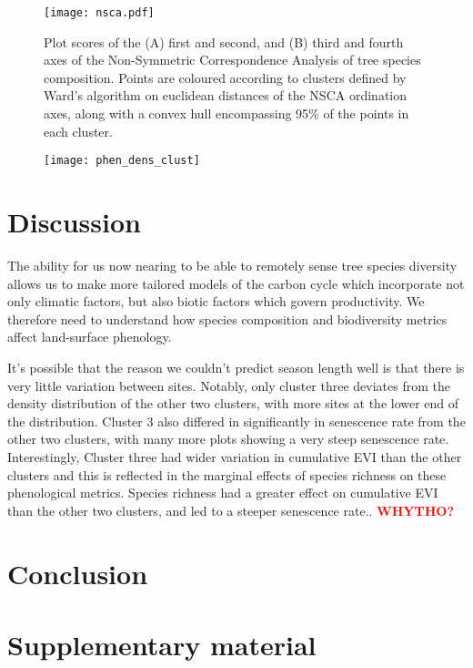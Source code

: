 \documentclass[11pt,a4paper]{article}
\newcommand{\todo}[1]{\textcolor{red}{\textbf{#1}}}   %
\begin{document}
\begin{figure}[H]
\centering
	\texttt{[image: nsca.pdf]}
	\caption{Plot scores of the (A) first and second, and (B) third and fourth axes of the Non-Symmetric Correspondence Analysis of tree species composition. Points are coloured according to clusters defined by Ward's algorithm on euclidean distances of the NSCA ordination axes, along with a convex hull encompassing 95\% of the points in each cluster.}
	\label{nsca}
\end{figure}

\begin{figure}[H]
\centering
	\texttt{[image: phen\_dens\_clust]}
	\caption{}
	\label{phen_dens_clust}
\end{figure}

\section{Discussion}

The ability for us now nearing to be able to remotely sense tree species diversity allows us to make more tailored models of the carbon cycle which incorporate not only climatic factors, but also biotic factors which govern productivity. We therefore need to understand how species composition and biodiversity metrics affect land-surface phenology. 

It's possible that the reason we couldn't predict season length well is that there is very little variation between sites. Notably, only cluster three deviates from the density distribution of the other two clusters, with more sites at the lower end of the distribution. Cluster 3 also differed in significantly in senescence rate from the other two clusters, with many more plots showing a very steep senescence rate. Interestingly, Cluster three had wider variation in cumulative EVI than the other clusters and this is reflected in the marginal effects of species richness on these phenological metrics. Species richness had a greater effect on cumulative EVI than the other two clusters, and led to a steeper senescence rate.. \todo{WHYTHO?}

\section{Conclusion}

\printbibliography

\section{Supplementary material}


\end{document}
